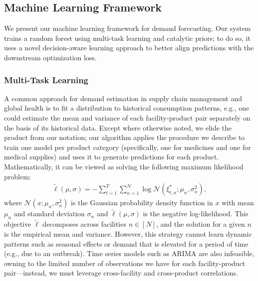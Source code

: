 \documentclass[12pt]{article}
\begin{document}
\subsection{Machine Learning Framework}
\label{sup:mlframework}

We present our machine learning framework for demand forecasting. Our system trains a random forest using multi-task learning and catalytic priors; to do so, it uses a novel decision-aware learning approach to better align predictions with the downstream optimization loss.

\subsubsection{Multi-Task Learning}
\label{sup:multitasklearning}
A common approach for demand estimation in supply chain management and global health is to fit a distribution to historical consumption patterns, e.g., one could estimate the mean and variance of each facility-product pair separately on the basis of its historical data. Except where otherwise noted, we elide the product from our notation; our algorithm applies the procedure we describe to train one model per product category (specifically, one for medicines and one for medical supplies) and uses it to generate predictions for each product. Mathematically, it can be viewed as solving the following maximum likelihood problem:
\begin{align*}
\tilde{\ell}(\mu,\sigma)=-\sum_{t=1}^T\sum_{n=1}^N\log\mathcal{N}(\xi_{t,n}^*;\mu_n,\sigma_n^2),
\end{align*}
where $\mathcal{N}(x;\mu_n,\sigma_n^2)$ is the Gaussian probability density function in $x$ with mean $\mu_n$ and standard deviation $\sigma_n$ and $\tilde{\ell}(\mu,\sigma)$ is the negative log-likelihood. This objective $\tilde{\ell}$ decomposes across facilities $n\in[N]$, and the solution for a given $n$ is the empirical mean and variance. However, this strategy cannot learn dynamic patterns such as seasonal effects or demand that is elevated for a period of time (e.g., due to an outbreak). Time series models such as ARIMA are also infeasible, owning to the limited number of observations we have for each facility-product pair---instead, we must leverage cross-facility and cross-product correlations.
\end{document}
